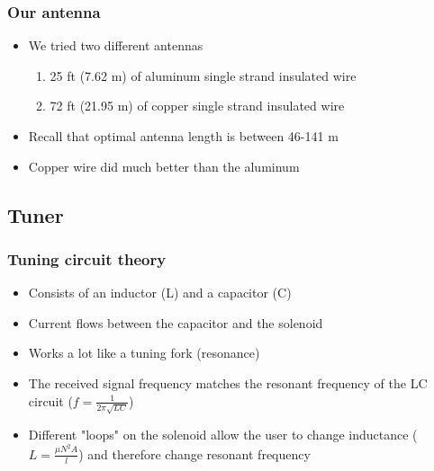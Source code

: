 \documentclass[11pt]{beamer}
\theoremstyle{definition}
\begin{document}
               \begin{frame}
                  \frametitle{Our antenna}
                  \begin{itemize}
                        \item We tried two different antennas
                            \vspace{2mm}
                        \begin{enumerate}
                            \item 25 ft (7.62 m) of aluminum single strand insulated wire
                            \vspace{1.5mm}
                            \item 72 ft (21.95 m) of copper single strand insulated wire
                        \end{enumerate}
                        \vspace{2mm}
                        \item Recall that optimal antenna length is between 46-141 m
                        \vspace{2mm}
                        \item Copper wire did much better than the aluminum
                  \end{itemize}
                \end{frame}

            \subsection{Tuner}
                \begin{frame}
                  \frametitle{Tuning circuit theory}
                  \begin{itemize}[<+->]
                        \item Consists of an inductor (L) and a capacitor (C)
                        \vspace{2mm}
                        \item Current flows between the capacitor and the solenoid
                        \vspace{2mm}
                        \item Works a lot like a tuning fork (resonance)
                        \vspace{2mm}
                        \item The received signal frequency matches the resonant frequency of the LC circuit ($f = \frac{1}{2 \pi \sqrt{LC}}$)
                        \vspace{2mm}
                        \item Different "loops" on the solenoid allow the user to change inductance ($L = \frac{\mu N^2 A}{l}$) and therefore change resonant frequency
                  \end{itemize}
                \end{frame}
\end{document}
